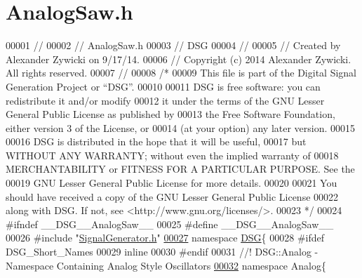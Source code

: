 \hypertarget{_analog_saw_8h_source}{\section{Analog\+Saw.\+h}
\label{_analog_saw_8h_source}
}

\begin{DoxyCode}
00001 \textcolor{comment}{//}
00002 \textcolor{comment}{//  AnalogSaw.h}
00003 \textcolor{comment}{//  DSG}
00004 \textcolor{comment}{//}
00005 \textcolor{comment}{//  Created by Alexander Zywicki on 9/17/14.}
00006 \textcolor{comment}{//  Copyright (c) 2014 Alexander Zywicki. All rights reserved.}
00007 \textcolor{comment}{//}
00008 \textcolor{comment}{/*}
00009 \textcolor{comment}{ This file is part of the Digital Signal Generation Project or “DSG”.}
00010 \textcolor{comment}{}
00011 \textcolor{comment}{ DSG is free software: you can redistribute it and/or modify}
00012 \textcolor{comment}{ it under the terms of the GNU Lesser General Public License as published by}
00013 \textcolor{comment}{ the Free Software Foundation, either version 3 of the License, or}
00014 \textcolor{comment}{ (at your option) any later version.}
00015 \textcolor{comment}{}
00016 \textcolor{comment}{ DSG is distributed in the hope that it will be useful,}
00017 \textcolor{comment}{ but WITHOUT ANY WARRANTY; without even the implied warranty of}
00018 \textcolor{comment}{ MERCHANTABILITY or FITNESS FOR A PARTICULAR PURPOSE.  See the}
00019 \textcolor{comment}{ GNU Lesser General Public License for more details.}
00020 \textcolor{comment}{}
00021 \textcolor{comment}{ You should have received a copy of the GNU Lesser General Public License}
00022 \textcolor{comment}{ along with DSG.  If not, see <http://www.gnu.org/licenses/>.}
00023 \textcolor{comment}{ */}
00024 \textcolor{preprocessor}{#ifndef \_\_DSG\_\_AnalogSaw\_\_}
00025 \textcolor{preprocessor}{#define \_\_DSG\_\_AnalogSaw\_\_}
00026 \textcolor{preprocessor}{#include "\hyperlink{_signal_generator_8h}{SignalGenerator.h}"}
\hypertarget{_analog_saw_8h_source_l00027}{}\hyperlink{namespace_d_s_g}{00027} \textcolor{keyword}{namespace }\hyperlink{namespace_d_s_g}{DSG}\{
00028 \textcolor{preprocessor}{#ifdef DSG\_Short\_Names}
00029     \textcolor{keyword}{inline}
00030 \textcolor{preprocessor}{#endif}
00031 \textcolor{comment}{    //! DSG::Analog - Namespace Containing Analog Style Oscillators}
\hypertarget{_analog_saw_8h_source_l00032}{}\hyperlink{namespace_d_s_g_1_1_analog}{00032} \textcolor{comment}{}    \textcolor{keyword}{namespace }Analog\{\textcolor{comment}{}

\end{DoxyCode}
